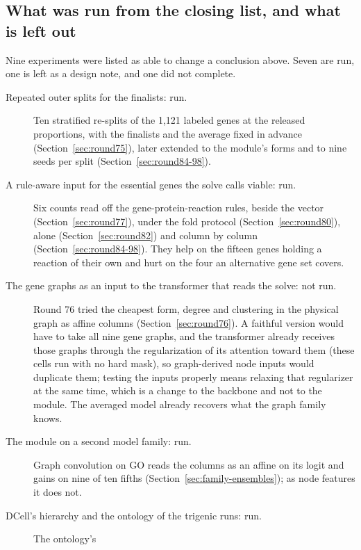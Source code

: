 

\subsection{What was run from the closing list, and what is left out}
\label{sec:left-to-run}

Nine experiments were listed as able to change a conclusion above. Seven are run, one is
left as a design note, and one did not complete.

\begin{description}
  \item[Repeated outer splits for the finalists: run.] Ten stratified re-splits of the
    1,121 labeled genes at the released proportions, with the finalists and the average
    fixed in advance (Section~\ref{sec:round75}), later extended to the module's forms
    and to nine seeds per split (Section~\ref{sec:round84-98}).
  \item[A rule-aware input for the essential genes the solve calls viable: run.] Six
    counts read off the gene-protein-reaction rules, beside the vector
    (Section~\ref{sec:round77}), under the fold protocol (Section~\ref{sec:round80}),
    alone (Section~\ref{sec:round82}) and column by column
    (Section~\ref{sec:round84-98}). They help on the fifteen genes holding a reaction of
    their own and hurt on the four an alternative gene set covers.
  \item[The gene graphs as an input to the transformer that reads the solve: not run.]
    Round 76 tried the cheapest form, degree and clustering in the physical graph as
    affine columns (Section~\ref{sec:round76}). A faithful version would have to take
    all nine gene graphs, and the transformer already receives those graphs through the
    regularization of its attention toward them (these cells run with no hard mask), so graph-derived node
    inputs would duplicate them; testing the inputs properly means relaxing that
    regularizer at the same time, which is a change to the backbone and not to the
    module. The averaged model already recovers what the graph family knows.
  \item[The module on a second model family: run.] Graph convolution on GO reads the
    columns as an affine on its logit and gains on nine of ten fifths
    (Section~\ref{sec:family-ensembles}); as node features it does not.
  \item[DCell's hierarchy and the ontology of the trigenic runs: run.] The ontology's

\end{description}
